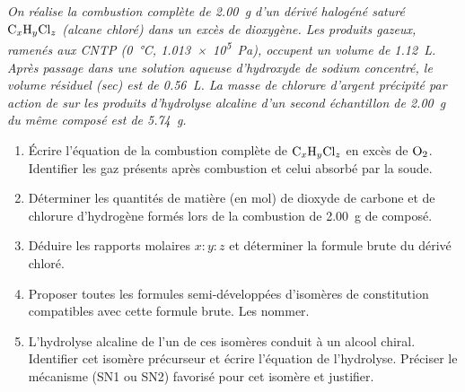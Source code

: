 \documentclass[11pt]{article}
\begin{document}
\begin{exercice}
\emph{On réalise la combustion complète de \SI{2,00}{\gram} d'un dérivé halogéné saturé $\ce{C_xH_yCl_z}$ (alcane chloré) dans un excès de dioxygène. Les produits gazeux, ramenés aux CNTP (\SI{0}{\celsius}, \SI{1,013e5}{\pascal}), occupent un volume de \SI{1,12}{\liter}. Après passage dans une solution aqueuse d'hydroxyde de sodium concentré, le volume résiduel (sec) est de \SI{0,56}{\liter}. La masse de chlorure d'argent  précipité par action de  sur les produits d'hydrolyse alcaline d'un second échantillon de \SI{2,00}{\gram} du même composé est de \SI{5,74}{\gram}.}
\begin{enumerate}
    \item Écrire l'équation de la combustion complète de $\ce{C_xH_yCl_z}$ en excès de $\ce{O2}$. Identifier les gaz présents après combustion et celui absorbé par la soude.
    \item Déterminer les quantités de matière (en mol) de dioxyde de carbone et de chlorure d'hydrogène formés lors de la combustion de \SI{2,00}{\gram} de composé.
    \item Déduire les rapports molaires $x:y:z$ et déterminer la formule brute du dérivé chloré.
    \item Proposer toutes les formules semi-développées d'isomères de constitution compatibles avec cette formule brute. Les nommer.
    \item L'hydrolyse alcaline de l'un de ces isomères conduit à un alcool chiral. Identifier cet isomère précurseur et écrire l'équation de l'hydrolyse. Préciser le mécanisme (SN1 ou SN2) favorisé pour cet isomère et justifier.
\end{enumerate}
\end{exercice}
\end{document}
